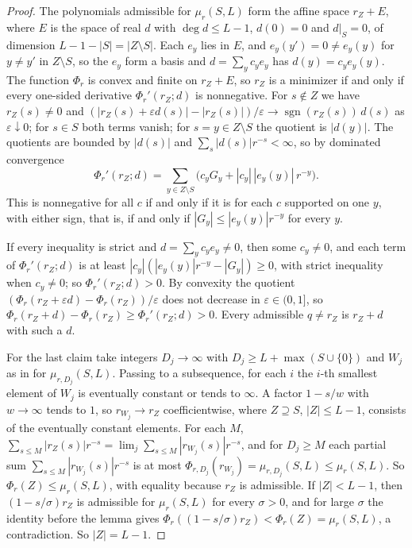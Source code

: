 \documentclass[11pt]{article}
\DeclareMathOperator{\sgn}{sgn}
\begin{document}
\begin{proof}
The polynomials admissible for $\mu_r(S,L)$ form the affine space
$r_Z+E$, where $E$ is the space of real $d$ with $\deg d\le L-1$, $d(0)=0$
and $d|_S=0$, of dimension $L-1-|S|=|Z\setminus S|$.  Each $e_y$ lies in
$E$, and $e_y(y')=0\ne e_y(y)$ for $y\ne y'$ in $Z\setminus S$, so the $e_y$
form a basis and $d=\sum_yc_ye_y$ has $d(y)=c_ye_y(y)$.  The function
$\Phi_r$ is convex and finite on $r_Z+E$, so $r_Z$ is a minimizer if and
only if every one-sided derivative $\Phi_r'(r_Z;d)$ is nonnegative.  For
$s\notin Z$ we have $r_Z(s)\ne0$ and
$(|r_Z(s)+\varepsilon d(s)|-|r_Z(s)|)/\varepsilon\to\sgn(r_Z(s))\,d(s)$ as
$\varepsilon\downarrow0$; for $s\in S$ both terms vanish; for
$s=y\in Z\setminus S$ the quotient is $|d(y)|$.  The quotients are bounded
by $|d(s)|$ and $\sum_s|d(s)|r^{-s}<\infty$, so by dominated convergence
\[
  \Phi_r'(r_Z;d)=\sum_{y\in Z\setminus S}\bigl(c_yG_y+|c_y|\,|e_y(y)|\,r^{-y}\bigr).
\]
This is nonnegative for all $c$ if and only if it is for each $c$
supported on one $y$, with either sign, that is, if and only if
$|G_y|\le|e_y(y)|r^{-y}$ for every $y$.

If every inequality is strict and $d=\sum_yc_ye_y\ne0$, then some
$c_y\ne0$, and each term of $\Phi_r'(r_Z;d)$ is at least
$|c_y|(|e_y(y)|r^{-y}-|G_y|)\ge0$, with strict inequality when $c_y\ne0$;
so $\Phi_r'(r_Z;d)>0$.  By convexity the quotient
$(\Phi_r(r_Z+\varepsilon d)-\Phi_r(r_Z))/\varepsilon$ does not decrease in
$\varepsilon\in(0,1]$, so
$\Phi_r(r_Z+d)-\Phi_r(r_Z)\ge\Phi_r'(r_Z;d)>0$.  Every admissible
$q\ne r_Z$ is $r_Z+d$ with such a $d$.

For the last claim take integers $D_j\to\infty$ with
$D_j\ge L+\max(S\cup\{0\})$ and $W_j$ as in \cite[Lemma~5.1]{coefficient-mass-rows} for
$\mu_{r,D_j}(S,L)$.  Passing to a subsequence, for each $i$ the $i$-th
smallest element of $W_j$ is eventually constant or tends to $\infty$.  A
factor $1-s/w$ with $w\to\infty$ tends to $1$, so $r_{W_j}\to r_Z$
coefficientwise, where $Z\supseteq S$, $|Z|\le L-1$, consists of the
eventually constant elements.  For each $M$,
$\sum_{s\le M}|r_Z(s)|r^{-s}=\lim_j\sum_{s\le M}|r_{W_j}(s)|r^{-s}$, and for
$D_j\ge M$ each partial sum $\sum_{s\le M}|r_{W_j}(s)|r^{-s}$ is at most
$\Phi_{r,D_j}(r_{W_j})=\mu_{r,D_j}(S,L)\le\mu_r(S,L)$.  So
$\Phi_r(Z)\le\mu_r(S,L)$, with equality because $r_Z$ is admissible.  If
$|Z|<L-1$, then $(1-s/\sigma)r_Z$ is admissible for $\mu_r(S,L)$ for every
$\sigma>0$, and for large $\sigma$ the identity before the lemma gives
$\Phi_r((1-s/\sigma)r_Z)<\Phi_r(Z)=\mu_r(S,L)$, a contradiction.  So
$|Z|=L-1$.
\end{proof}
\end{document}
